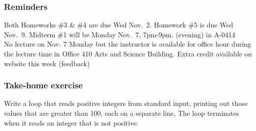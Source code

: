 \documentclass[11pt]{beamer}
\begin{document}
\begin{frame}
  \frametitle{Reminders}
  \Enlarge

 	\begin{itemize}
 		\myitem  Both Homeworks \#3 \& \#4 are due Wed Nov.\ 2.
 		\myitem  Homework \#5 is due Wed Nov.\ 9.
 		\myitem  Midterm \#1 will be Monday Nov.\ 7, 7pm-9pm.  (evening) in A-0414\\ \textcolor{CS101GradBot}{No lecture on Nov. 7 Monday but the instructor is available for office hour during the lecture time in Office 410 Arts and Science Building.}
 		\myitem  Extra credit available on website this week (feedback)
 	\end{itemize}
\end{frame}

\begin{frame}
  \frametitle{Take-home exercise}
  \Enlarge

  Write a loop that reads positive integers from standard input, printing out those values that are greater than 100, each on a separate line, The loop terminates when it reads an integer that is not positive.
\end{frame}
\end{document}
